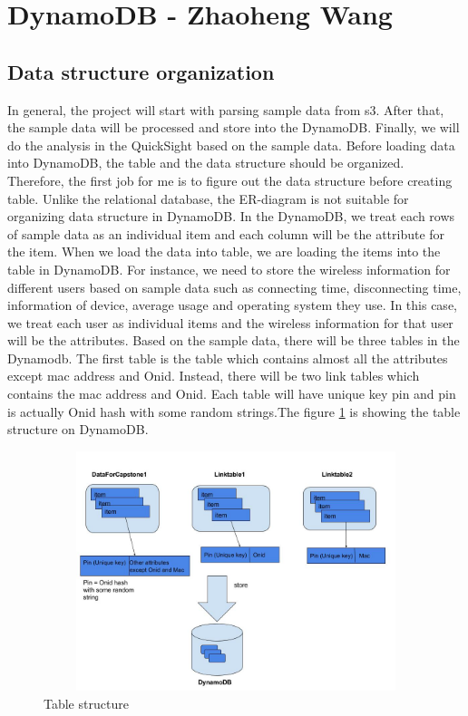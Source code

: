 \section{DynamoDB - Zhaoheng Wang}
	\subsection{Data structure organization}
     In general, the project will start with parsing sample data from s3. After that, the sample data will be processed and store into the DynamoDB. Finally,  we will do the analysis in the QuickSight based on the sample data. Before loading data into DynamoDB, the table and the data structure should be organized. Therefore, the ﬁrst job for me is to ﬁgure out the data structure before creating table. Unlike the relational database, the ER-diagram is not suitable for organizing data structure in DynamoDB. In the DynamoDB, we treat each rows of sample data as an individual item and each column will be the attribute for the item. When we load the data into table, we are loading the items into the table in DynamoDB. For instance, we need to store the wireless information for different users based on sample data such as connecting time, disconnecting time, information of device, average usage and operating system they use. In this case, we treat each user as individual items and the wireless information for that user will be the attributes. Based on the sample data, there will be three tables in the Dynamodb. The ﬁrst table is the table which contains almost all the attributes except mac address and Onid. Instead, there will be two link tables which contains the mac address and Onid. Each table will have unique key pin and pin is actually Onid hash with some random strings.The figure \ref{fig:1} is showing the table structure on DynamoDB.
\begin{figure}[H]
 \includegraphics[width=17cm, height=7cm]{7.jpg}
 \centering
 \caption{\label{fig:1}Table structure}
 \end{figure}
 
